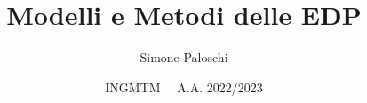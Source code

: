 \usepackage{hyperref}
\usepackage[utf8]{inputenc}
\usepackage{amsfonts}
\usepackage{amsmath}
\usepackage{amssymb}
\usepackage{dsfont} %
\usepackage{tikz}
\usepackage{bbm}
\usepackage{relsize}
\usepackage{pgfplots}
\pgfplotsset{compat=1.18}
\usepackage{scalerel}
\usepackage{wrapfig}
\usepackage[T1]{fontenc}       %
\usepackage[framed,numbered]{matlab-prettifier}


\setlength{\parindent}{0cm} 

\setlength{\footskip}{1.3cm}


\usepackage[
	left=2.5cm, %
	right=2.5cm, %
	top=2.3cm,
	bottom=2.8cm,
	]{geometry}







\renewcommand{\contentsname}{Indice}



\title{Modelli e Metodi delle EDP}
\author{Simone Paloschi}
\date{INGMTM \ \ A.A. 2022/2023}
\linespread{1.5}

\DeclareRobustCommand{\Chi}{{\mathpalette\irchi\relax}}
\newcommand{\irchi}[2]{\raisebox{\depth}{$#1\chi$}} %


\newcommand{\EE}{\mathbb E}
\newcommand{\NN}{\mathbb N}
\newcommand{\PP}{\mathbb P}
\newcommand{\R}{\mathbb R}
\newcommand{\ZZ}{\mathbb Z}

\newcommand{\Ac}{\mathcal A}
\newcommand{\Bc}{\mathcal B}
\newcommand{\Cc}{\mathcal C}
\newcommand{\Ec}{\mathcal E}
\newcommand{\Fc}{\mathcal F}
\newcommand{\Gc}{\mathcal G}
\newcommand{\Hc}{\mathcal H}
\newcommand{\Lc}{\mathcal L}
\newcommand{\Nc}{\mathcal N}
\newcommand{\Pc}{\mathcal P}
\newcommand{\Uc}{\mathcal U}
\newcommand{\Vc}{\mathcal V}
\newcommand{\Oc}{\mathcal O}
\newcommand{\Tau}{\mathcal T}

\usepackage{esvect}


\newcommand{\eps}{\varepsilon}
\renewcommand{\phi}{\varphi}



\renewcommand{\frac}{\dfrac}

\let \INT \int 
\renewcommand{\int}{\displaystyle\INT}


\newcommand{\ind}{\perp \!\!\! \perp} %

